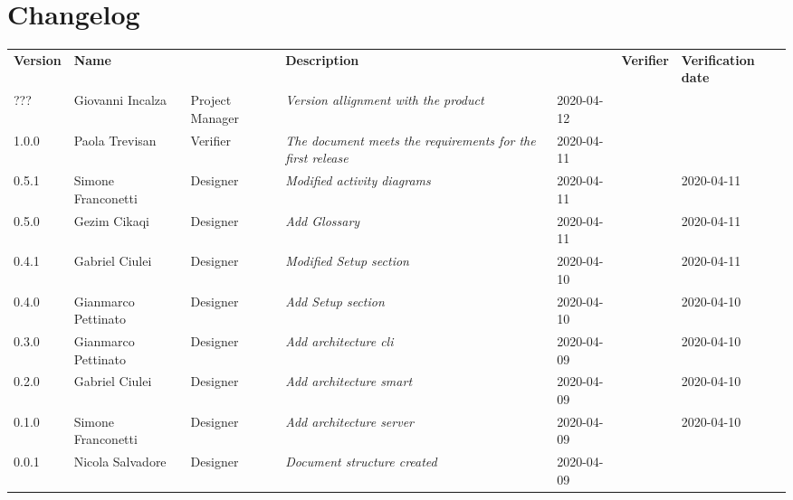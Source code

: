 \section*{Changelog}
\renewcommand{\arraystretch}{1.8}
  \setlength\LTleft{-1.7cm}
  \begin{longtable}{|p{1.7cm}|p{2cm}|p{2.5cm}|p{3cm}|p{1.7cm}|p{2cm}|p{2.3cm}|}
    \hline
    \rowcolor{header}
    \textbf{Version} & \textbf{Name} & \centering{\textbf{Role}} & \textbf{Description} &      \centering{\textbf{Date}} & \textbf{Verifier} & \textbf{Verification date} \\
    
    ??? & Giovanni Incalza & Project Manager & \small{\textit{Version allignment with the product}} & 2020-04-12 &  & \\
    
    1.0.0 & Paola Trevisan & Verifier & \small{\textit{The document meets the requirements for the first release}} & 2020-04-11 &  & \\
    0.5.1 & Simone Franconetti & Designer & \small{\textit{Modified activity diagrams}} & 2020-04-11 &  & 2020-04-11\\
    0.5.0 & Gezim Cikaqi & Designer & \small{\textit{Add Glossary}} & 2020-04-11 &  & 2020-04-11\\
    0.4.1 & Gabriel Ciulei & Designer & \small{\textit{Modified Setup section}} & 2020-04-10 &  & 2020-04-11\\
    0.4.0 & Gianmarco Pettinato & Designer & \small{\textit{Add Setup section}} & 2020-04-10 &  & 2020-04-10\\
    0.3.0 & Gianmarco Pettinato & Designer & \small{\textit{Add architecture cli}} & 2020-04-09 &  & 2020-04-10\\
    0.2.0 & Gabriel Ciulei & Designer & \small{\textit{Add architecture smart}} & 2020-04-09 &  & 2020-04-10\\
    0.1.0 & Simone Franconetti & Designer & \small{\textit{Add architecture server}} & 2020-04-09 &  & 2020-04-10\\
    0.0.1 & Nicola Salvadore & Designer & \small{\textit{Document structure created}} & 2020-04-09 &  & \\

    \hline
  \end{longtable}
\setlength\LTleft{0cm}
\restoregeometry
